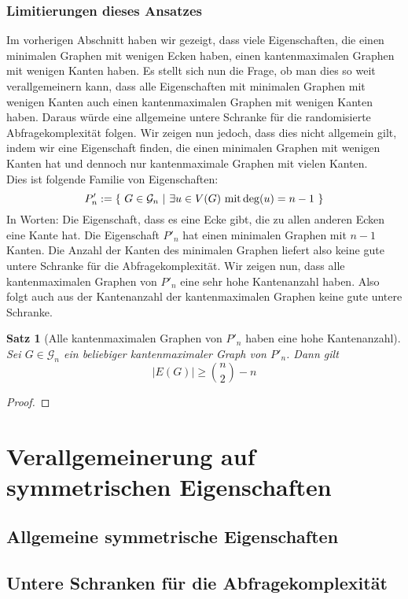 \documentclass[a4paper]{scrreprt}
\newtheorem{Satz}[definition]{Satz}
\theoremstyle{definition}
\begin{document}
\subsection{Limitierungen dieses Ansatzes}
Im vorherigen Abschnitt haben wir gezeigt, dass viele Eigenschaften,
die einen  minimalen Graphen mit wenigen Ecken haben, einen kantenmaximalen
Graphen mit wenigen Kanten haben. Es stellt sich nun die Frage,
ob man dies so weit verallgemeinern kann, dass alle Eigenschaften
mit minimalen Graphen mit wenigen Kanten auch einen kantenmaximalen
Graphen mit wenigen Kanten haben. Daraus würde eine allgemeine
untere Schranke für die randomisierte Abfragekomplexität folgen.
Wir zeigen nun jedoch, dass dies nicht allgemein gilt, indem wir
eine Eigenschaft finden, die einen minimalen Graphen mit wenigen
Kanten hat und dennoch nur kantenmaximale Graphen mit vielen Kanten. \\
Dies ist folgende Familie von Eigenschaften:
$$ P'_n := \{ \ G \in \mathcal{G}_n \ 
| \ \exists u\in V(G) \textup{ mit} \deg(u) = n-1 \ \}$$
In Worten: Die Eigenschaft, dass es eine Ecke gibt,
die zu allen anderen Ecken eine Kante hat.
Die Eigenschaft $P'_n$ hat einen minimalen Graphen mit
$n-1$ Kanten. Die Anzahl der Kanten des minimalen Graphen
liefert also keine gute untere Schranke für die Abfragekomplexität.
Wir zeigen nun, dass alle kantenmaximalen Graphen von $P'_n$
eine sehr hohe Kantenanzahl haben. Also folgt auch aus der Kantenanzahl
der kantenmaximalen Graphen keine gute untere Schranke.
\begin{Satz}[Alle kantenmaximalen Graphen von $P'_n$ 
             haben eine hohe Kantenanzahl]
Sei $G\in \mathcal{G}_n$ ein beliebiger kantenmaximaler Graph
von $P'_n$. Dann gilt
$$ |E(G)| \geq \binom{n}{2} - n $$
\end{Satz}
\begin{proof}

\end{proof}


\chapter{Verallgemeinerung auf symmetrischen Eigenschaften}

\section{Allgemeine symmetrische Eigenschaften}

\section{Untere Schranken für die Abfragekomplexität}
\end{document}

